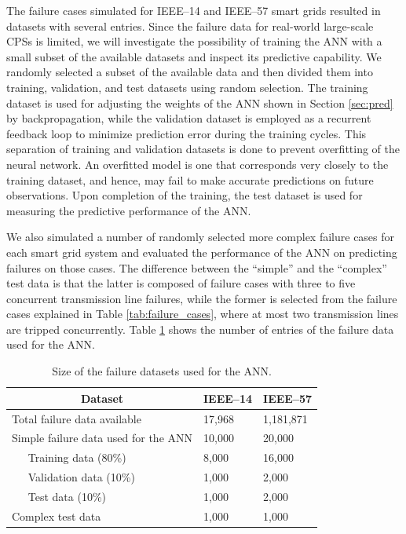 \documentclass[12pt]{elsarticle}
\begin{document}
The failure cases simulated for IEEE--14 and IEEE--57 smart grids resulted in datasets with several entries. Since the failure data for real-world large-scale CPSs is limited, we will investigate the possibility of training the ANN with a small subset of the available datasets and inspect its predictive capability. We randomly selected a subset of the available data and then divided them into training, validation, and test datasets using random selection. The training dataset is used for adjusting the weights of the ANN shown in Section \ref{sec:pred} by backpropagation, while the validation dataset is employed as a recurrent feedback loop to minimize prediction error during the training cycles. This separation of training and validation datasets is done to prevent overfitting of the neural network. An overfitted model is one that corresponds very closely to the training dataset, and hence, may fail to make accurate predictions on future observations. Upon completion of the training, the test dataset is used for measuring the predictive performance of the ANN.

We also simulated a number of randomly selected more complex failure cases for each smart grid system and evaluated the performance of the ANN on predicting failures on those cases. The difference between the ``simple'' and the ``complex'' test data is that the latter is composed of failure cases with three to five concurrent transmission line failures, while the former is selected from the failure cases explained in Table \ref{tab:failure_cases}, where at most two transmission lines are tripped concurrently. Table \ref{tab:nn_data} shows the number of entries of the failure data used for the ANN.

\begin{table}
\caption{Size of the failure datasets used for the ANN.}
\label{tab:nn_data}
\centering
\renewcommand{\arraystretch}{1.1}
\begin{tabular}{ll|l|l}
\multicolumn{2}{c|}{Dataset}                              & IEEE--14 & IEEE--57  \\ \hline
\multicolumn{2}{l|}{Total failure data available}         & 17,968   & 1,181,871 \\
\multicolumn{2}{l|}{Simple failure data used for the ANN} & 10,000   & 20,000    \\
 & Training data (80\%)                                   & 8,000    & 16,000    \\
 & Validation data (10\%)                                 & 1,000    & 2,000     \\
 & Test data (10\%)                                       & 1,000    & 2,000     \\
\multicolumn{2}{l|}{Complex test data}                    & 1,000    & 1,000     \\
\end{tabular}
\end{table}
\end{document}
